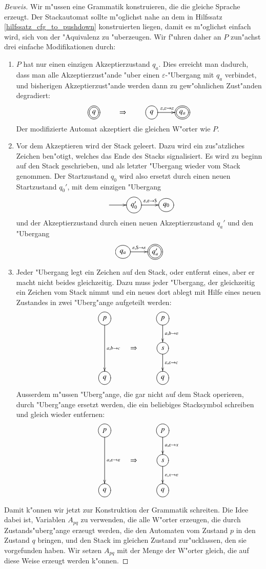\begin{proof}[Beweis]
Wir m"ussen eine Grammatik konstruieren, die die gleiche Sprache
erzeugt. Der Stackautomat sollte m"oglichst nahe an dem in
Hilfssatz \ref{hilfssatz_cfg_to_pushdown} konstruierten liegen, damit es
m"oglichst einfach wird, sich von der "Aquivalenz zu "uberzeugen.
Wir f"uhren daher an $P$ zun"achst drei einfache Modifikationen
durch: 
\begin{enumerate}
\item $P$ hat nur einen einzigen Akzeptierzustand
$q_a$.
Dies erreicht man dadurch, dass man alle Akzeptierzust"ande "uber
einen $\varepsilon$-"Ubergang mit
$q_a$ verbindet, und bisherigen Akzeptierzust"ande
werden dann zu gew"ohnlichen Zust"anden degradiert:
\[
\xymatrix{
*++[o][F=]{q}
	&\Rightarrow
		&*++[o][F]{q}\ar[r]^{\varepsilon,\varepsilon\to\varepsilon}
			&*++[o][F=]{q_a}
}		
\]
Der modifizierte Automat akzeptiert die gleichen W"orter wie $P$.
\item Vor dem Akzeptieren wird der Stack geleert. Dazu wird ein zus"atzliches
Zeichen ben"otigt, welches das Ende des Stacks signalisiert. Es wird zu
beginn auf den Stack geschrieben, und als letzter "Ubergang wieder
vom Stack genommen. Der Startzustand $q_0$ wird also ersetzt durch einen neuen
Startzustand $q_0'$, mit dem einzigen "Ubergang 
\[
\entrymodifiers={++[o][F]}
\xymatrix{
*+\txt{}\ar[r]
	&{q_0'}\ar[r]^{\varepsilon,\varepsilon\to {\tt\$}}
		&q_0
}
\]
und der Akzeptierzustand  durch einen neuen Akzeptierzustand $q_a'$ und
den "Ubergang
\[
\entrymodifiers={++[o][F]}
\xymatrix{
{q_a}\ar[r]^{\varepsilon,{\tt\$}\to\varepsilon}
	&*++[o][F=]{q_a'}
}
\]
\item Jeder "Ubergang legt ein Zeichen auf den Stack, oder entfernt
eines, aber er macht nicht beides gleichzeitig. Dazu muss jeder "Ubergang,
der gleichzeitig ein Zeichen vom Stack nimmt und ein neues dort ablegt
mit Hilfe eines neuen Zustandes in zwei "Uberg"ange aufgeteilt werden:
\[
\xymatrix{
*++[o][F]{p}\ar[dd]^{a,b\to c}
	&*+\txt{}
		&*++[o][F]{p}\ar[d]^{a,b\to\varepsilon}
\\
	&\Rightarrow
		&*++[o][F]{s}\ar[d]^{\varepsilon,\varepsilon\to c}
\\
*++[o][F]{q}
	&
		&*++[o][F]{q}
}
\]
Ausserdem m"ussen "Uberg"ange, die gar nicht auf dem Stack operieren,
durch "Uberg"ange ersetzt werden, die ein beliebiges Stacksymbol
schreiben und gleich wieder entfernen:
\[
\xymatrix{
*++[o][F]{p}\ar[dd]^{a,\varepsilon\to \varepsilon}
	&*+\txt{}
		&*++[o][F]{p}\ar[d]^{a,\varepsilon\to x}
\\
	&\Rightarrow
		&*++[o][F]{s}\ar[d]^{\varepsilon,x\to \varepsilon}
\\
*++[o][F]{q}
	&
		&*++[o][F]{q}
}
\]
\end{enumerate}
Damit k"onnen wir jetzt zur Konstruktion der Grammatik schreiten.
Die Idee dabei ist, Variablen $A_{pq}$ zu verwenden, die alle 
W"orter erzeugen, die durch Zustands"uberg"ange erzeugt werden,
die den Automaten vom Zustand $p$ in den Zustand $q$ bringen,
und den Stack im gleichen Zustand zur"ucklassen, den sie vorgefunden
haben.
Wir setzen $A_{pq}$ mit der Menge der W"orter gleich, die
auf diese Weise erzeugt werden k"onnen.


\end{proof}
